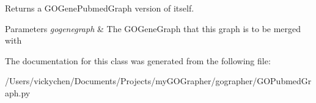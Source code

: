 Returns a GOGenePubmedGraph version of itself. 


\begin{DoxyParams}{Parameters}
{\em gogenegraph} & The GOGeneGraph that this graph is to be merged with \\
\hline
\end{DoxyParams}


The documentation for this class was generated from the following file:\begin{DoxyCompactItemize}
\item 
/Users/vickychen/Documents/Projects/myGOGrapher/gographer/GOPubmedGraph.py\end{DoxyCompactItemize}
